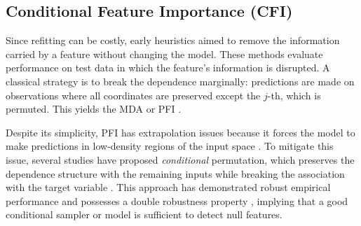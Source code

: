 \documentclass{article}
\theoremstyle{plain}
\theoremstyle{definition}
\theoremstyle{remark}
\begin{document}
 \subsection{Conditional Feature Importance (CFI)}
%
Since refitting can be costly, early heuristics aimed to remove the information carried by a feature without changing the model. These methods evaluate performance on test data in which the feature’s information is disrupted. A classical strategy is to break the dependence marginally: predictions are made on observations where all coordinates are preserved except the $j$-th, which is permuted. This yields the MDA \cite{Breiman2001} or PFI \cite{Mi2021}.



Despite its simplicity, PFI has extrapolation issues because it forces the model to make predictions in low-density regions of the input space \cite{Hooker2019PleaseSP}. To mitigate this issue, several studies have proposed \emph{conditional} permutation, which preserves the dependence structure with the remaining inputs while breaking the association with the target variable \cite{Strobl2008}. This approach has demonstrated robust empirical performance \cite{chamma2024statistically} and possesses a double robustness property \cite{reyerolobo2025conditionalfeatureimportancerevisited}, implying that a good conditional sampler or model is sufficient to detect null features.
\end{document}
